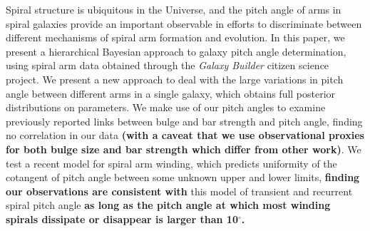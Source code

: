 Spiral structure is ubiquitous in the Universe, and the pitch angle of arms in spiral galaxies provide an important observable in efforts to discriminate between different mechanisms of spiral arm formation and evolution. In this paper, we present a hierarchical Bayesian approach to galaxy pitch angle determination, using spiral arm data obtained through the \textit{Galaxy Builder} citizen science project. We present a new approach to deal with the large variations in pitch angle between different arms in a single galaxy, which obtains full posterior distributions on parameters. We make use of our pitch angles to examine previously reported links between bulge and bar strength and pitch angle, finding no correlation in our data {\bf (with a caveat that we use observational proxies for both bulge size and bar strength which differ from other work)}. We test a recent model for spiral arm winding, which predicts uniformity of the cotangent of pitch angle between some unknown upper and lower limits, {\bf finding our observations are consistent with} this model of transient and recurrent spiral pitch angle {\bf as long as the pitch angle at which most winding spirals dissipate or disappear is larger than 10$^\circ$.}
